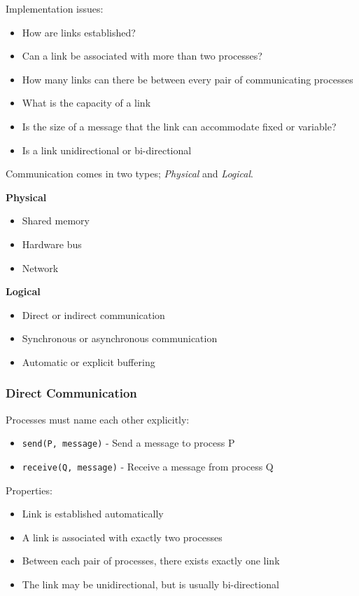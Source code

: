\documentclass[]{article}
\begin{document}
Implementation issues:
\begin{itemize}
    \item How are links established?
    \item Can a link be associated with more than two processes?
    \item How many links can there be between every pair of communicating processes
    \item What is the capacity of a link
    \item Is the size of a message that the link can accommodate fixed or variable?
    \item Is a link unidirectional or bi-directional
\end{itemize}

Communication comes in two types; \emph{Physical} and \emph{Logical}. 

{\bf Physical}
\begin{itemize}
    \item Shared memory
    \item Hardware bus
    \item Network
\end{itemize}

{\bf Logical}
\begin{itemize}
    \item Direct or indirect communication
    \item Synchronous or asynchronous communication
    \item Automatic or explicit buffering
\end{itemize}

\subsubsection*{Direct Communication}

Processes must name each other explicitly:
\begin{itemize}
    \item \verb|send(P, message)| - Send a message to process P
    \item \verb|receive(Q, message)| - Receive a message from process Q
\end{itemize}

Properties:
\begin{itemize}
    \item Link is established automatically
    \item A link is associated with exactly two processes
    \item Between each pair of processes, there exists exactly one link
    \item The link may be unidirectional, but is usually bi-directional
\end{itemize}
\end{document}
